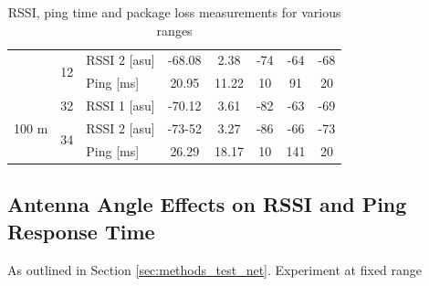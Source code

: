 \begin{table}[H]
\begin{tabular}{|c|c|l|c|c|c|c|c|}
        & \multirow{2}{*}{12} & RSSI 2 [asu] & -68.08 & 2.38 & -74 & -64 & -68 \\\cline{3-8}
        && Ping [ms] & 20.95 & 11.22 & 10 & 91 & 20 \\\hline\hline
        \multirow{3}{*}{100 m} & \multirow{1}{*}{32} & RSSI 1 [asu] & -70.12 & 3.61 & -82 & -63 & -69 \\\cline{2-8}\cline{2-8}
        & \multirow{2}{*}{34} & RSSI 2 [asu] & -73-52 & 3.27 & -86 & -66 & -73 \\\cline{3-8}
        && Ping [ms] & 26.29 & 18.17 & 10 & 141 & 20 \\\hline
    \end{tabular}
    \vspace{\ftspace}
    \caption{RSSI, ping time and package loss measurements for various ranges}
    \label{tab:ping_rssi_res}
\end{table}

\subsection{\label{sec:res_angle} Antenna Angle Effects on RSSI and Ping Response Time}

As outlined in Section \ref{sec:methods_test_net}. Experiment at fixed range


